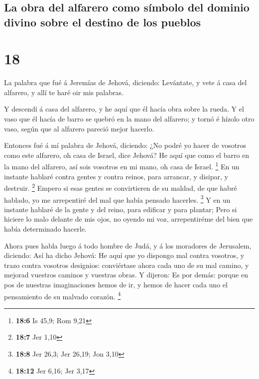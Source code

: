 \hypertarget{la-obra-del-alfarero-como-suxedmbolo-del-dominio-divino-sobre-el-destino-de-los-pueblos}{%
\subsection{La obra del alfarero como símbolo del dominio divino sobre
el destino de los
pueblos}\label{la-obra-del-alfarero-como-suxedmbolo-del-dominio-divino-sobre-el-destino-de-los-pueblos}}

\hypertarget{section-17}{%
\section{18}\label{section-17}}

 La palabra que fué á Jeremías de Jehová, diciendo:
 Levántate, y vete á casa del alfarero, y allí te haré oir
mis palabras.

 Y descendí á casa del alfarero, y he aquí que él hacía
obra sobre la rueda.  Y el vaso que él hacía de barro se
quebró en la mano del alfarero; y tornó é hízolo otro vaso, según que al
alfarero pareció mejor hacerlo.

 Entonces fué á mí palabra de Jehová, diciendo:
 ¿No podré yo hacer de vosotros como este alfarero, oh
casa de Israel, dice Jehová? He aquí que como el barro en la mano del
alfarero, así sois vosotros en mi mano, oh casa de Israel. \footnote{\textbf{18:6}
  Is 45,9; Rom 9,21}  En un instante hablaré contra gentes
y contra reinos, para arrancar, y disipar, y destruir. \footnote{\textbf{18:7}
  Jer 1,10}  Empero si esas gentes se convirtieren de su
maldad, de que habré hablado, yo me arrepentiré del mal que había
pensado hacerles. \footnote{\textbf{18:8} Jer 26,3; Jer 26,19; Jon 3,10}
 Y en un instante hablaré de la gente y del reino, para
edificar y para plantar;  Pero si hiciere lo malo delante
de mis ojos, no oyendo mi voz, arrepentiréme del bien que había
determinado hacerle.

 Ahora pues habla luego á todo hombre de Judá, y á los
moradores de Jerusalem, diciendo: Así ha dicho Jehová: He aquí que yo
dispongo mal contra vosotros, y trazo contra vosotros designios:
conviértase ahora cada uno de su mal camino, y mejorad vuestros caminos
y vuestras obras.  Y dijeron: Es por demás: porque en pos
de nuestras imaginaciones hemos de ir, y hemos de hacer cada uno el
pensamiento de su malvado corazón. \footnote{\textbf{18:12} Jer 6,16;
  Jer 3,17}

